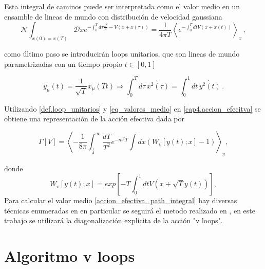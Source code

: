 Esta integral de caminos puede ser interpretada como el valor medio en un ensamble de lineas de mundo con distribución de velocidad gaussiana
\begin{equation}
\mathcal{N} 
\int _{x(0) = x(T)} \mathscr D x e ^{- \int _0 ^T d \tau \frac{\dot{x} ^2}{4} - V(x + x( \tau )) } =
\frac{1}{4 \pi T} \left<  e ^{- \int _0 ^T dt   V(x + x(t)) }  \right> _{x}
\, ,
\label{eq_valores_medio}
\end{equation}

como último paso se introducirán loops unitarios, que son lineas de mundo parametrizadas con un tiempo propio $t \in [0,1]$

\begin{equation}
y _{\mu} (t) = \frac{1}{\sqrt{T}} x _{\mu} (T t)
\Longrightarrow
\int _{0} ^{T} d \tau \, \dot{x ^2 ( \tau)} = \int _{0} ^{1} dt \, \dot{y ^2 ( t)}
\, .
\label{def.loop_unitarios}
\end{equation}

Utilizando \eqref{def.loop_unitarios} y  \eqref{eq_valores_medio} en \eqref{cap4.accion_efecitva} se obtiene una representación de la acción efectiva dada por

\begin{equation}
\Gamma \left[ V \right] = 
\left<
-  \frac{1}{8 \pi}
\int _{\frac{1}{\Lambda}} ^{\infty} \frac{dT}{T^ {2}} e ^{- m^2 T}
\int dx \left( W _v [ y(t); x] - 1\right)
\right> _{y} 
 ,
\label{accion_efectiva_path_integral}
\end{equation}


donde
\begin{equation}
W _v [ y(t); x] = exp \left[ -T \int _{0} ^{1} dt V( x + \sqrt{T} y(t)) \right]
 , 
\label{eq.definicion_w}
\end{equation}
Para calcular el valor medio \eqref{accion_efectiva_path_integral} hay diversas técnicas enumeradas en \cite{Gies_2003} en particular se seguirá el metodo realizado en \cite{Franchino_Vi_as_2019}, en este trabajo se utilizará la diagonalización explícita de la acción "v loops".



\section{Algoritmo v loops}


